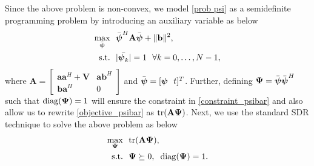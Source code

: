 \documentclass[journal,draftclsnofoot,onecolumn,12pt]{IEEEtran}
\begin{document}
Since the above problem is non-convex, we model  \eqref{prob psi} as a semidefinite programming problem by introducing an auxiliary variable as below
\begin{subequations}
\begin{align}
    \max_{\Bar{\boldsymbol{\psi}}} ~~& \Bar{\boldsymbol{\psi}}^H\mathbf{A}\Bar{\boldsymbol{\psi}} + \|\mathbf{b}\|^2,\label{objective_psibar}\\
   \text{s.t.} ~~& |\Bar{\boldsymbol{\psi}_k}| = 1 ~~ \forall k = 0,\ldots,N-1,\label{constraint_psibar}
\end{align}\label{obj psibar}%
\end{subequations}
where $\mathbf{A} = \begin{bmatrix}
                 \mathbf{aa}^H+\mathbf{V} & \mathbf{ab}^H\\
                 \mathbf{ba}^H & 0\label{MatrixA}
                 \end{bmatrix}$ and $\Bar{\boldsymbol{\psi}} = [ \boldsymbol{\psi}~~t]^T$.
Further, defining $\mathbf{\Psi} = \Bar{\boldsymbol{\psi}}\Bar{\boldsymbol{\psi}}^H$ such that ${\rm diag}(\mathbf{\Psi}) = 1$ will ensure the constraint in \eqref{constraint_psibar} and also 
allow us to rewrite \eqref{objective_psibar} as ${\rm tr}(\mathbf{A\Psi})$. %
Next, we use the standard SDR technique to solve the above problem as below  
\begin{subequations}
\begin{align}
    \max_{\mathbf{\Psi}} ~~& {\rm tr}(\mathbf{A\Psi}) ,\\
   \text{s.t.} ~~& \mathbf{\Psi} \succeq 0, \hspace{0.2cm}{\rm diag}(\mathbf{\Psi}) = 1.
\end{align}\label{relaxed_phi}%
\end{subequations}
\end{document}

